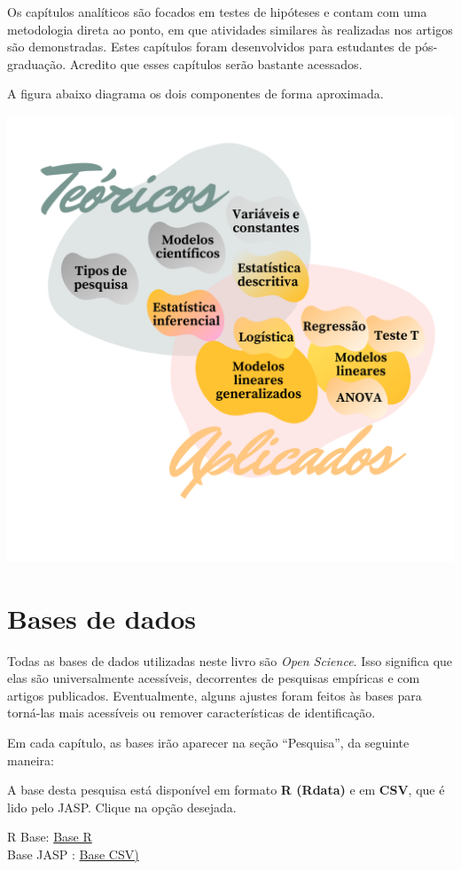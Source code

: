 \documentclass[
]{book}
\begin{document}
Os capítulos analíticos são focados em testes de hipóteses e contam com uma metodologia direta ao ponto, em que atividades similares às realizadas nos artigos são demonstradas. Estes capítulos foram desenvolvidos para estudantes de pós-graduação. Acredito que esses capítulos serão bastante acessados.

A figura abaixo diagrama os dois componentes de forma aproximada.

\includegraphics{./img/proposta.png}

\hypertarget{bases-de-dados}{%
\section{Bases de dados}\label{bases-de-dados}}

Todas as bases de dados utilizadas neste livro são \emph{Open Science}. Isso significa que elas são universalmente acessíveis, decorrentes de pesquisas empíricas e com artigos publicados. Eventualmente, alguns ajustes foram feitos às bases para torná-las mais acessíveis ou remover características de identificação.

Em cada capítulo, as bases irão aparecer na seção ``Pesquisa'', da seguinte maneira:

\begin{base}

A base desta pesquisa está disponível em formato \textbf{R (Rdata)} e em \textbf{CSV}, que é lido pelo JASP. Clique na opção desejada.

R Base: \href{}{Base R}\\
Base JASP : \href{}{Base CSV)}

\end{base}
\end{document}
